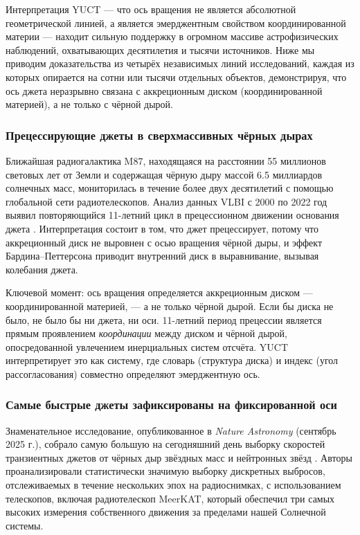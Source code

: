\documentclass[12pt,a4paper]{article}
\begin{document}
	Интерпретация YUCT — что ось вращения не является абсолютной геометрической линией, а является эмерджентным свойством координированной материи — находит сильную поддержку в огромном массиве астрофизических наблюдений, охватывающих десятилетия и тысячи источников. Ниже мы приводим доказательства из четырёх независимых линий исследований, каждая из которых опирается на сотни или тысячи отдельных объектов, демонстрируя, что ось джета неразрывно связана с аккреционным диском (координированной материей), а не только с чёрной дырой.
	
	\subsubsection{Прецессирующие джеты в сверхмассивных чёрных дырах}
	
	Ближайшая радиогалактика M87, находящаяся на расстоянии 55 миллионов световых лет от Земли и содержащая чёрную дыру массой 6.5 миллиардов солнечных масс, мониторилась в течение более двух десятилетий с помощью глобальной сети радиотелескопов. Анализ данных VLBI с 2000 по 2022 год выявил повторяющийся 11-летний цикл в прецессионном движении основания джета \cite{M87Precession2024}. Интерпретация состоит в том, что джет прецессирует, потому что аккреционный диск не выровнен с осью вращения чёрной дыры, и эффект Бардина–Петтерсона приводит внутренний диск в выравнивание, вызывая колебания джета.
	
	Ключевой момент: ось вращения определяется аккреционным диском — координированной материей, — а не только чёрной дырой. Если бы диска не было, не было бы ни джета, ни оси. 11-летний период прецессии является прямым проявлением \emph{координации} между диском и чёрной дырой, опосредованной увлечением инерциальных систем отсчёта. YUCT интерпретирует это как систему, где словарь (структура диска) и индекс (угол рассогласования) совместно определяют эмерджентную ось.
	
	\subsubsection{Самые быстрые джеты зафиксированы на фиксированной оси}
	
	Знаменательное исследование, опубликованное в \emph{Nature Astronomy} (сентябрь 2025 г.), собрало самую большую на сегодняшний день выборку скоростей транзиентных джетов от чёрных дыр звёздных масс и нейтронных звёзд \cite{NatureAstronomy2025}. Авторы проанализировали статистически значимую выборку дискретных выбросов, отслеживаемых в течение нескольких эпох на радиоснимках, с использованием телескопов, включая радиотелескоп MeerKAT, который обеспечил три самых высоких измерения собственного движения за пределами нашей Солнечной системы.
	
\end{document}
